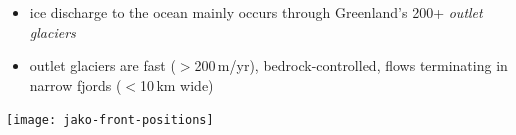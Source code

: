\documentclass[hide notes,intlimits]{beamer}
\begin{document}
\begin{frame}[plain]
    \begin{itemize}
    \item ice discharge to the ocean mainly occurs through Greenland's 200+ \emph{outlet glaciers}
    \item outlet glaciers are fast ($>$200\,m/yr), bedrock-controlled, flows terminating in narrow fjords ($<$10\,km wide)
    \end{itemize}
    \begin{center}
      \texttt{[image: jako-front-positions]}
    \end{center}
\end{frame}

 
\end{document}
